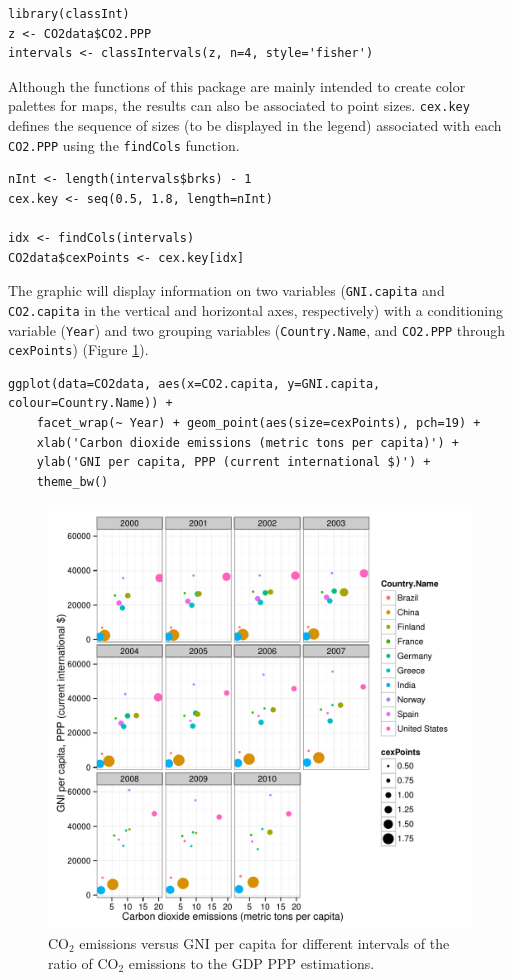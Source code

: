 \lstset{language=R,numbers=none}
\begin{lstlisting}
library(classInt)
z <- CO2data$CO2.PPP
intervals <- classIntervals(z, n=4, style='fisher')
\end{lstlisting}

Although the functions of this package are mainly intended to create
color palettes for maps, the results can also be associated to
point sizes. \texttt{cex.key} defines the sequence of sizes (to be
displayed in the legend) associated with each \texttt{CO2.PPP} using the
\texttt{findCols} function.
\lstset{language=R,numbers=none}
\begin{lstlisting}
nInt <- length(intervals$brks) - 1
cex.key <- seq(0.5, 1.8, length=nInt)

idx <- findCols(intervals)
CO2data$cexPoints <- cex.key[idx]
\end{lstlisting}

The graphic will display information on two variables (\texttt{GNI.capita}
and \texttt{CO2.capita} in the vertical and horizontal axes, respectively)
with a conditioning variable (\texttt{Year}) and two grouping variables
(\texttt{Country.Name}, and \texttt{CO2.PPP} through \texttt{cexPoints}) (Figure
\ref{fig:CO2pointsGG}).

\lstset{language=R,numbers=none}
\begin{lstlisting}
ggplot(data=CO2data, aes(x=CO2.capita, y=GNI.capita, colour=Country.Name)) +
    facet_wrap(~ Year) + geom_point(aes(size=cexPoints), pch=19) +
    xlab('Carbon dioxide emissions (metric tons per capita)') +
    ylab('GNI per capita, PPP (current international $)') +
    theme_bw()
\end{lstlisting}

\begin{figure}[htb]
\centering
\includegraphics[width=.9\linewidth]{figs/CO2pointsGG.pdf}
\caption{\label{fig:CO2pointsGG}$\mathrm{CO_2}$ emissions versus GNI per capita for different intervals of the ratio of $\mathrm{CO_2}$ emissions to the GDP PPP estimations.}
\end{figure}

